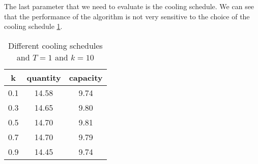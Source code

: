 The last parameter that we need to evaluate is the cooling schedule. We can see that the performance of the algorithm is not very sensitive to the choice of the cooling schedule \ref{tab:sa-cool}.
\begin{table}[H]
    \centering
    \begin{tabular}{c||c |c}
        k   & quantity & capacity \\ \hline
        0.1 & 14.58    & 9.74     \\
        0.3 & 14.65    & 9.80     \\
        0.5 & 14.70    & 9.81     \\
        0.7 & 14.70    & 9.79     \\
        0.9 & 14.45    & 9.74     \\
    \end{tabular}
    \caption{Different cooling schedules and $T=1$ and $k=10$}
    \label{tab:sa-cool}
\end{table}